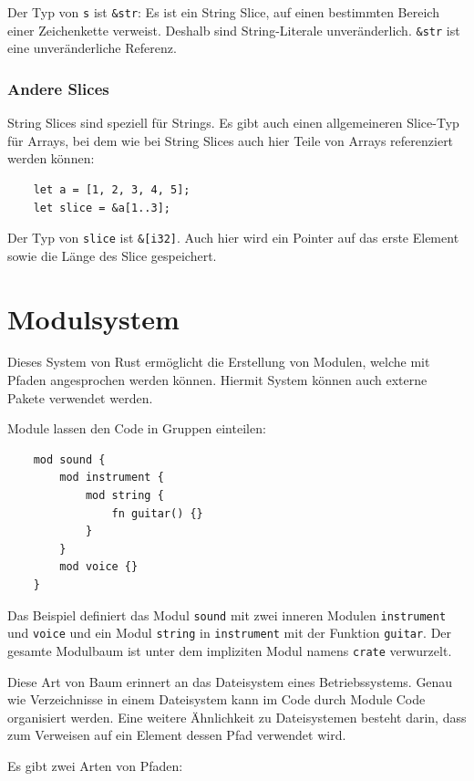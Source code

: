 Der Typ von \verb"s" ist \verb"&str": Es ist ein String Slice, auf einen bestimmten Bereich einer Zeichenkette verweist. Deshalb sind String-Literale unveränderlich. \verb"&str" ist eine unveränderliche Referenz.

\subsubsection{Andere Slices}

String Slices sind speziell für Strings. Es gibt auch einen allgemeineren Slice-Typ für Arrays, bei dem wie bei String Slices auch hier Teile von Arrays referenziert werden können:

\begin{lstlisting}
    let a = [1, 2, 3, 4, 5];
    let slice = &a[1..3];
\end{lstlisting}

Der Typ von \verb"slice" ist \verb"&[i32]". Auch hier wird ein Pointer auf das erste Element sowie die Länge des Slice gespeichert.


\section{Modulsystem}

Dieses System von Rust ermöglicht die Erstellung von Modulen, welche mit Pfaden angesprochen werden können. Hiermit System können auch externe Pakete verwendet werden.

Module lassen den Code in Gruppen einteilen:

\begin{lstlisting}
    mod sound {
        mod instrument {
            mod string {
                fn guitar() {}
            }
        }
        mod voice {}
    }
\end{lstlisting}

Das Beispiel definiert das Modul \verb"sound" mit zwei inneren Modulen \verb"instrument" und \verb"voice" und ein Modul \verb"string" in \verb"instrument" mit der Funktion \verb"guitar". Der gesamte Modulbaum ist unter dem impliziten Modul namens \verb"crate" verwurzelt.

Diese Art von Baum erinnert an das Dateisystem eines Betriebssystems. Genau wie Verzeichnisse in einem Dateisystem kann im Code durch Module Code or\-ga\-ni\-siert werden. Eine weitere Ähnlichkeit zu Dateisystemen besteht darin, dass zum Verweisen auf ein Element dessen Pfad verwendet wird.

Es gibt zwei Arten von Pfaden:

